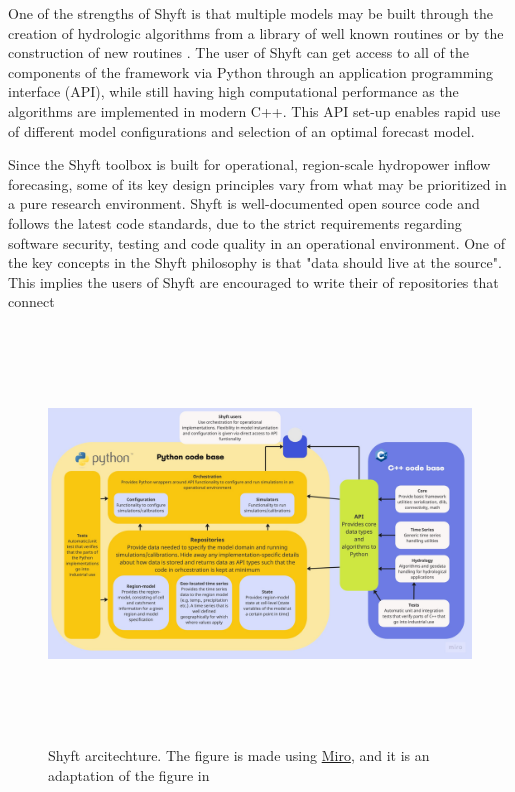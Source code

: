One of the strengths of Shyft is that multiple models may be built through the creation of hydrologic algorithms from a library of well known routines or by the construction of new routines \autocite{burkhartShyftV4Framework2021}. The user of Shyft can get access to all of the components of the framework via Python through an application programming interface (API), while still having high computational performance as the algorithms are implemented in modern C++. This API set-up enables rapid use of different model configurations and selection of an optimal forecast model. 

Since the Shyft toolbox is built for operational, region-scale hydropower inflow forecasing, some of its key design principles vary from what may be prioritized in a pure research environment. Shyft is well-documented open source code and follows the latest code standards, due to the strict requirements regarding software security, testing and code quality in an operational environment. One of the key concepts in the Shyft philosophy is that "data should live at the source". This implies the users of Shyft are encouraged to write their of repositories that connect 

\begin{figure}[ht]
    \centering
    \includegraphics[width=1.1\textwidth,height=11cm]{figures/methods/Shyft Architecture.jpg}
    \caption{Shyft arcitechture. The figure is made using \href{https://miro.com}{Miro}, and it is an adaptation of the figure in \autocite{burkhartShyftV4Framework2021}}
    \label{fig:shyft_architecture}
\end{figure}


